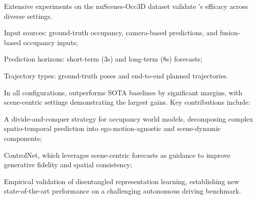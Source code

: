 Extensive experiments on the nuScenes-Occ3D dataset validate \mtd{}'s efficacy across diverse settings.
\begin{inparaenum}[a)]
\item Input sources: ground-truth occupancy, camera-based predictions, and fusion-based occupancy inputs;
\item Prediction horizons: short-term (3s) and long-term (8s) forecasts;
\item Trajectory types: ground-truth poses and end-to-end planned trajectories.
\end{inparaenum}

In all configurations, \mtd{} outperforms SOTA baselines by significant margins, with scene-centric settings demonstrating the largest gains. Key contributions include:
\begin{inparaenum}[1)]
\item A divide-and-conquer strategy for occupancy world models, decomposing complex spatio-temporal prediction into ego-motion-agnostic and scene-dynamic components;
\item \mtd{} ControlNet, which leverages scene-centric forecasts as guidance to improve generative fidelity and spatial consistency;
\item Empirical validation of disentangled representation learning, establishing new state-of-the-art performance on a challenging autonomous driving benchmark.
\end{inparaenum}



